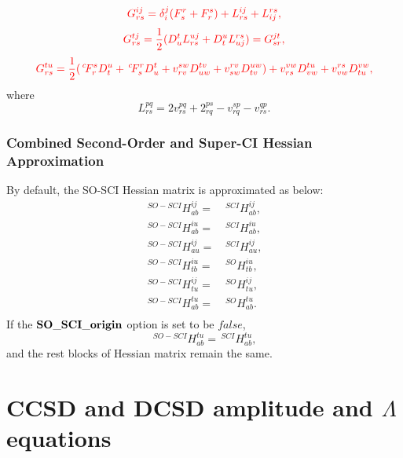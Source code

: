 \documentclass[a4paper,12pt,oneside]{book}
\newcommand{\red}[1]{{\color{red} #1}}
\newcommand{\pre}[1]{\,#1\!}
\begin{document}
\begin{equation}
\red{G^{ij}_{rs} = \delta_i^j(F^r_s+F^s_r)+L^{ij}_{rs} + L^{rs}_{ij},}
\end{equation}
\begin{equation}
\red{G^{tj}_{rs} = \frac{1}{2}(D^t_uL^{uj}_{rs} + D^u_tL^{rs}_{uj}) = G^{jt}_{sr},}
\end{equation}
\begin{equation}
\red{G^{tu}_{rs} = \frac{1}{2}( \pre{^c}F_r^sD_t^u + \pre{^c}F_s^rD_u^t  + v^{sw}_{rv}D^{tv}_{uw} + v^{rv}_{sw}D^{uw}_{tv})+v^{vw}_{rs}D^{tu}_{vw} + v_{vw}^{rs}D_{tu}^{vw},}
\end{equation}
where
\begin{equation}
  L^{pq}_{rs} = 2v^{pq}_{rs} +2^{ps}_{rq} - v^{sp}_{rq} - v^{qp}_{rs}.
\end{equation}

\subsection{Combined Second-Order and Super-CI Hessian Approximation}
By default, the SO-SCI Hessian matrix \cite{kreplinMCSCF2020} is approximated as below:
\begin{equation}
\begin{aligned}
\pre{^{SO-SCI}}H_{ab}^{ij} =& \pre{^{SCI}}H_{ab}^{ij},\\
\pre{^{SO-SCI}}H_{ab}^{iu} =& \pre{^{SCI}}H_{ab}^{iu},\\
\pre{^{SO-SCI}}H_{au}^{ij} =& \pre{^{SCI}}H_{au}^{ij},\\
\pre{^{SO-SCI}}H_{tb}^{iu} =& \pre{^{SO}}H_{tb}^{iu},\\
\pre{^{SO-SCI}}H_{tu}^{ij} =& \pre{^{SO}}H_{tu}^{ij},\\
\pre{^{SO-SCI}}H_{ab}^{tu} =& \pre{^{SO}}H_{ab}^{tu}.\\
\end{aligned}
\end{equation}
If the $\bf{SO\_SCI\_origin}$ option is set to be $false$, 
\begin{equation}
  \pre{^{SO-SCI}}H_{ab}^{tu} = \pre{^{SCI}}H_{ab}^{tu},
\end{equation}
and the rest blocks of Hessian matrix remain the same.

\chapter{CCSD and DCSD amplitude and $\Lambda$ equations}
\end{document}
